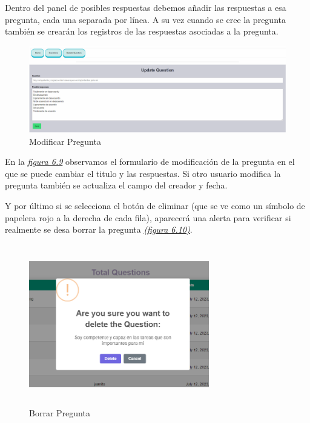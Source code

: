 Dentro del panel de posibles respuestas debemos añadir las respuestas a esa pregunta, cada una separada por línea. A su vez cuando se cree la pregunta también se crearán los registros de las respuestas asociadas a la pregunta. \vspace{1cm}

\begin{figure}[!ht]
    \centering
    \includegraphics[width=1\textwidth]{imagenes/update_pregunta.png}
    \caption{ Modificar Pregunta}
    \label{fig:modify-question}
\end{figure}\vspace{0.5cm}

En la \textit{\hyperref[fig:modify-question]{figura 6.9}} observamos el formulario de modificación de la pregunta en el que se puede cambiar el titulo y las respuestas. Si otro usuario modifica la pregunta también se actualiza el campo del creador y fecha.

Y por último si se selecciona el botón de eliminar (que se ve como un símbolo de papelera rojo a la derecha de cada fila), aparecerá una alerta para verificar si realmente se desa borrar la pregunta \textit{\hyperref[fig:delete-question]{(figura 6.10)}}.

\begin{figure}[!ht]
    \centering
    \includegraphics[width=0.7\textwidth, height=7cm]{imagenes/delete_pregunta.png}
    \caption{ Borrar Pregunta}
    \label{fig:delete-question}
\end{figure}\vspace{3cm}




